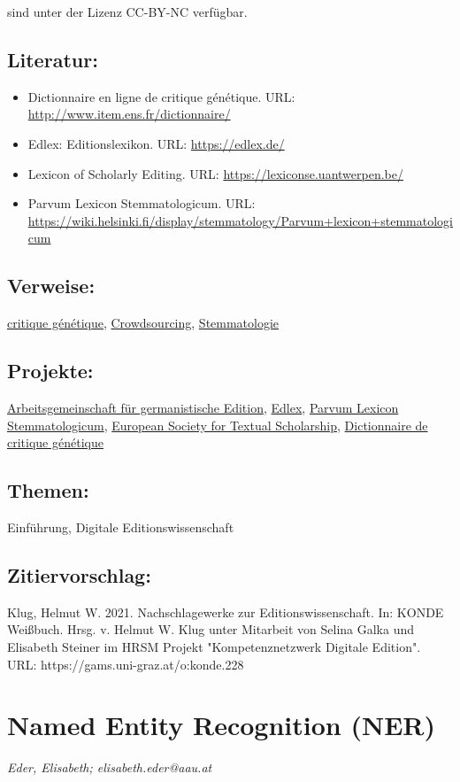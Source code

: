 \documentclass{article}
\begin{document}
\begin{itemize}
{                     sind unter der Lizenz CC-BY-NC verfügbar.}\end{itemize}\subsection*{Literatur:}\begin{itemize}\item Dictionnaire en ligne de critique génétique. URL: \url{http://www.item.ens.fr/dictionnaire/}\item Edlex: Editionslexikon. URL: \url{https://edlex.de/}\item Lexicon of Scholarly Editing. URL: \url{https://lexiconse.uantwerpen.be/}\item Parvum Lexicon Stemmatologicum. URL: \url{https://wiki.helsinki.fi/display/stemmatology/Parvum+lexicon+stemmatologicum}\end{itemize}\subsection*{Verweise:}\href{https://gams.uni-graz.at/o:konde.46}{critique génétique}, \href{https://gams.uni-graz.at/o:konde.47}{Crowdsourcing}, \href{https://gams.uni-graz.at/o:konde.172}{Stemmatologie}\subsection*{Projekte:}\href{https://www.ag-edition.org}{Arbeitsgemeinschaft
                           für germanistische Edition}, \href{https://edlex.de/}{Edlex}, \href{https://wiki.helsinki.fi/display/stemmatology}{Parvum Lexicon Stemmatologicum}, \href{https://textualscholarship.eu}{European Society
                           for Textual Scholarship}, \href{http://www.item.ens.fr/dictionnaire/}{Dictionnaire de critique génétique}\subsection*{Themen:}Einführung, Digitale Editionswissenschaft\subsection*{Zitiervorschlag:}Klug, Helmut W. 2021. Nachschlagewerke zur Editionswissenschaft. In: KONDE Weißbuch. Hrsg. v. Helmut W. Klug unter Mitarbeit von Selina Galka und Elisabeth Steiner im HRSM Projekt "Kompetenznetzwerk Digitale Edition". URL: https://gams.uni-graz.at/o:konde.228\newpage\section*{Named Entity Recognition (NER)} \emph{Eder, Elisabeth; elisabeth.eder@aau.at }\\
        
\end{document}
